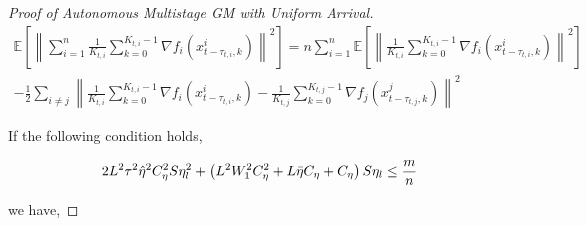 \begin{proof}[Proof of Autonomous Multistage GM with Uniform Arrival]
\begin{equation}
\begin{gathered}
\mathbb{E}\left[\left\| \sum_{i=1}^n \frac{1}{K_{t,i}} \sum_{k=0}^{K_{t,i}-1} \nabla f_i(x_{t-\tau_{t,i},k}^i) \right\|^2\right]=n\sum_{i=1}^n\mathbb{E}\left[\left\| \frac{1}{K_{t,i}} \sum_{k=0}^{K_{t,i}-1} \nabla f_i(x_{t-\tau_{t,i},k}^i) \right\|^2\right] \\- \frac{1}{2}\sum_{i\neq j} \left\| \frac{1}{K_{t,i}} \sum_{k=0}^{K_{t,i}-1} \nabla f_i(x_{t-\tau_{t,i},k}^i) - \frac{1}{K_{t,j}} \sum_{k=0}^{K_{t,j}-1} \nabla f_j(x_{t-\tau_{t,j},k}^j) \right\|^2
\end{gathered}\nonumber
\end{equation}

If the following condition holds,

\begin{equation}
\begin{gathered}
2L^2\tau^2\hat{\eta}^2C_\eta^2 S \eta_l^2 + \left( L^2 W_1^2 C_\eta^2 + L \Bar{\eta} C_\eta + C_\eta \right) S \eta_l \leq \frac{m}{n} 
\end{gathered}\nonumber
\end{equation}

we have,


\end{proof}
